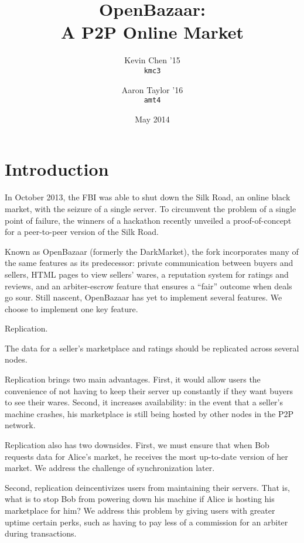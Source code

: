 \documentclass[12pt,twocolumn]{article}
\title{\bf \sc OpenBazaar: \\ A P2P Online Market}
\author{
    {\rm Kevin Chen '15} \\
    {\tt kmc3}
    \and 
    {\rm Aaron Taylor '16} \\
    {\tt amt4}
}
\date{May 2014}
\begin{document}
\maketitle

\doublespacing



\section{Introduction}
In October 2013, the FBI was able to shut down the Silk Road, an online black market, with the seizure of a single server. To circumvent the problem of a single point of failure, the winners of a hackathon recently unveiled a proof-of-concept for a peer-to-peer version of the Silk Road.

Known as OpenBazaar (formerly the DarkMarket), the fork incorporates many of the same features as its predecessor: private communication between buyers and sellers, HTML pages to view sellers' wares, a reputation system for ratings and reviews, and an arbiter-escrow feature that ensures a ``fair'' outcome when deals go sour. Still nascent, OpenBazaar has yet to implement several features.
We choose to implement one key feature.

Replication.

The data for a seller's marketplace and ratings should be replicated across several nodes.

Replication brings two main advantages.
First, it would allow users the convenience of not having to keep their server up constantly if they want buyers to see their wares.
Second, it increases availability: in the event that a seller's machine crashes, his marketplace is still being hosted by other nodes in the P2P network.

Replication also has two downsides. First, we must ensure that when Bob requests data for Alice's market, he receives the most up-to-date version of her market. We address the challenge of synchronization later.

Second, replication deincentivizes users from maintaining their servers. That is, what is to stop Bob from powering down his machine if Alice is hosting his marketplace for him? We address this problem by giving users with greater uptime certain perks, such as having to pay less of a commission for an arbiter during transactions.
\end{document}
